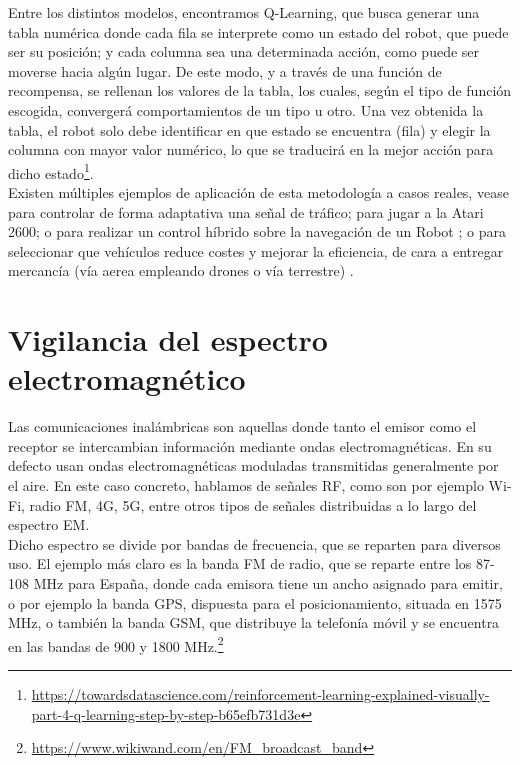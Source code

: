 Entre los distintos modelos, encontramos Q-Learning, que busca generar una tabla numérica donde cada fila se interprete como un estado del robot, que puede ser su posición; y cada columna sea una determinada acción, como puede ser moverse hacia algún lugar. De este modo, y a través de una función de recompensa, se rellenan los valores de la tabla, los cuales, según el tipo de función escogida, convergerá comportamientos de un tipo u otro. Una vez obtenida la tabla, el robot solo debe identificar en que estado se encuentra (fila) y elegir la columna con mayor valor numérico, lo que se traducirá en la mejor acción para dicho estado\footnote[21]{\url{https://towardsdatascience.com/reinforcement-learning-explained-visually-part-4-q-learning-step-by-step-b65efb731d3e}}.\\

Existen múltiples ejemplos de aplicación de esta metodología a casos reales, vease para controlar de forma adaptativa una señal de tráfico; para jugar a la Atari 2600; o para realizar un control híbrido sobre la navegación de un Robot \cite{q-learning-app}; o para seleccionar que vehículos reduce costes y mejorar la eficiencia, de cara a entregar mercancía (vía aerea empleando drones o vía terrestre) \cite{CHEN2022939}.

\section{Vigilancia del espectro electromagnético}
\label{subsec:señales}

Las comunicaciones inalámbricas son aquellas donde tanto el emisor como el receptor se intercambian información mediante ondas electromagnéticas. En su defecto usan ondas electromagnéticas moduladas transmitidas generalmente por el aire. En este caso concreto, hablamos de señales \ac{RF}, como son por ejemplo Wi-Fi, radio FM, 4G, 5G, entre otros tipos de señales distribuidas a lo largo del espectro \ac{EM}.\\

Dicho espectro se divide por bandas de frecuencia, que se reparten para diversos uso. El ejemplo más claro es la banda FM de radio, que se reparte entre los 87-108 MHz para España, donde cada emisora tiene un ancho asignado para emitir, o por ejemplo la banda GPS, dispuesta para el posicionamiento, situada en 1575 MHz, o también la banda GSM, que distribuye la telefonía móvil y se encuentra en las bandas de 900 y 1800 MHz.\footnote[22]{\url{https://www.wikiwand.com/en/FM_broadcast_band}}\\

